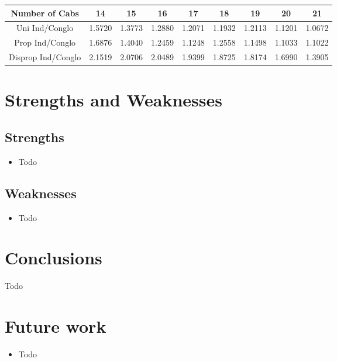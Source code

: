 \documentclass[titlepage]{article}
\begin{document}
\begin{center}
\begin{tabular}{ | c | c | c | c | c | c | c | c | c | }
\hline
 Number of Cabs & 14 & 15 & 16 & 17 & 18 & 19 & 20 & 21 \\\hline
Uni Ind/Conglo & 1.5720  &  1.3773  &  1.2880 &   1.2071 &   1.1932 &  1.2113  &  1.1201  &  1.0672\\\hline
Prop Ind/Conglo & 1.6876  &  1.4040  &  1.2459  &  1.1248  &  1.2558  &  1.1498  &  1.1033  &  1.1022\\\hline
Disprop Ind/Conglo & 2.1519  &  2.0706 &   2.0489  &  1.9399  &  1.8725 &   1.8174  &  1.6990 &   1.3905\\
\hline
\end{tabular}
\end{center}

\section{Strengths and Weaknesses}
\subsection{Strengths}
\begin{itemize}
\item Todo
\end{itemize}
\subsection{Weaknesses}
\begin{itemize}
\item Todo
\end{itemize}

\section{Conclusions}
Todo

\section{Future work}
\begin{itemize}
\item Todo
\end{itemize}

\pagebreak
\end{document}
